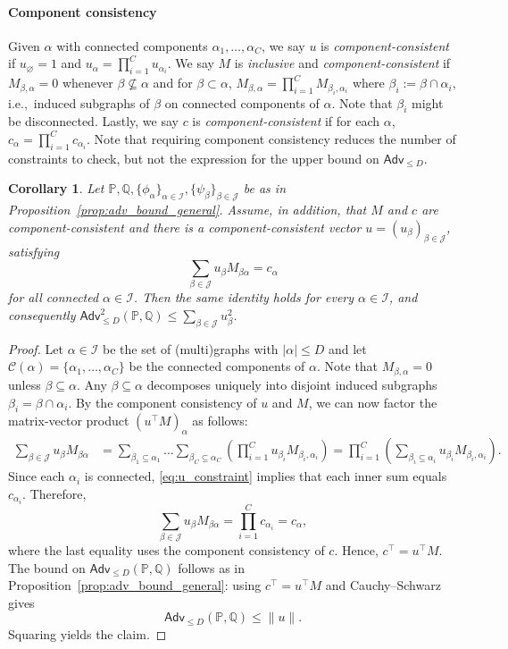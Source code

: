 \documentclass[11pt, letterpaper]{article}
\newtheorem{corollary}[theorem]{Corollary}
\numberwithin{equation}{section}
\newcommand{\Adv}{\mathsf{Adv}}
\newcommand{\cJ}{\mathcal{J}}
\newcommand{\cI}{\mathcal{I}}
\newcommand{\PP}{\mathbb{P}}
\newcommand{\QQ}{\mathbb{Q}}
\begin{document}
\paragraph*{Component consistency} Given $\alpha$ with connected components $\alpha_1,\ldots,\alpha_C$, we say $u$ is \emph{component-consistent} if $u_\varnothing=1$ and
$
u_\alpha=\prod_{i=1}^C u_{\alpha_i}$. We say $M$ is \emph{inclusive} and \emph{component-consistent} if $M_{\beta,\alpha}=0$ whenever $\beta \not\subseteq \alpha$ and for $\beta \subset \alpha$, 
$ M_{\beta,\alpha}=\prod_{i=1}^C M_{\beta_i,\alpha_i}$ where $\beta_i := \beta \cap \alpha_i$, i.e.,\ induced subgraphs of $\beta$ on connected components of $\alpha$. Note that $\beta_i$ might be disconnected. Lastly, we say $c$ is \emph{component-consistent} if for each $\alpha$, $c_\alpha = \prod_{i=1}^Cc_{\alpha_i}$. Note that requiring component consistency reduces the number of constraints to check, but not the expression for the upper bound on $\Adv_{\leq D}$.


\begin{corollary}\label{prop:adv_bound_connected}
Let $\PP,\QQ,\{\phi_\alpha\}_{\alpha\in\mathcal I}, \{\psi_\beta\}_{\beta\in\mathcal J}$ be as in Proposition~\ref{prop:adv_bound_general}. Assume, in addition, that $M$ and $c$ are component-consistent and there is a component-consistent vector $u = (u_\beta)_{\beta \in \cJ}$, satisfying  %
\begin{equation}\label{eq:u_constraint}
\sum_{\beta \in \cJ} u_\beta M_{\beta \alpha} = c_\alpha
\end{equation}
%
for all connected $\alpha \in \cI$. Then the same identity holds for
every $\alpha\in\mathcal I$, and consequently $\Adv_{\leq D}^2(\PP,\QQ) \leq \sum_{\beta \in \cJ} u_\beta^2$.
\end{corollary}
%
\begin{proof}
Let $\alpha \in \cI$ be the set of (multi)graphs with $|\alpha|\leq D$ and let $\mathcal{C}(\alpha) = \{\alpha_1, \dots, \alpha_C\}$ be the connected components of $\alpha$. Note that $M_{\beta, \alpha} = 0$ unless $\beta \subseteq \alpha$. Any $\beta \subseteq \alpha$ decomposes uniquely into disjoint induced subgraphs $\beta_i = \beta \cap \alpha_i$. By the component consistency of $u$ and $M$, we can now factor the matrix-vector product $(u^\top M)_\alpha$ as follows:
\begin{align*}
\sum_{\beta \in \cJ} u_\beta M_{\beta \alpha} 
&= \sum_{\beta_1 \subseteq \alpha_1} \dots \sum_{\beta_C \subseteq \alpha_C} \left( \prod_{i=1}^C u_{\beta_i} M_{\beta_i, \alpha_i} \right) = \prod_{i=1}^C \left( \sum_{\beta_i \subseteq \alpha_i} u_{\beta_i} M_{\beta_i, \alpha_i} \right).
\end{align*}
Since each $\alpha_i$ is connected, \eqref{eq:u_constraint} implies that each inner sum equals $c_{\alpha_i}$. Therefore,
\[
\sum_{\beta \in \cJ} u_\beta M_{\beta \alpha}
= \prod_{i=1}^C c_{\alpha_i}
= c_\alpha,
\]
where the last equality uses the component consistency of $c$. Hence, $c^\top = u^\top M$. The bound on $\Adv_{\le D}(\PP,\QQ)$ follows as in Proposition~\ref{prop:adv_bound_general}: using $c^\top=u^\top M$ and Cauchy--Schwarz gives
\[
\Adv_{\le D}(\PP,\QQ)\le \|u\|.
\]
Squaring yields the claim.
\end{proof}
\end{document}
